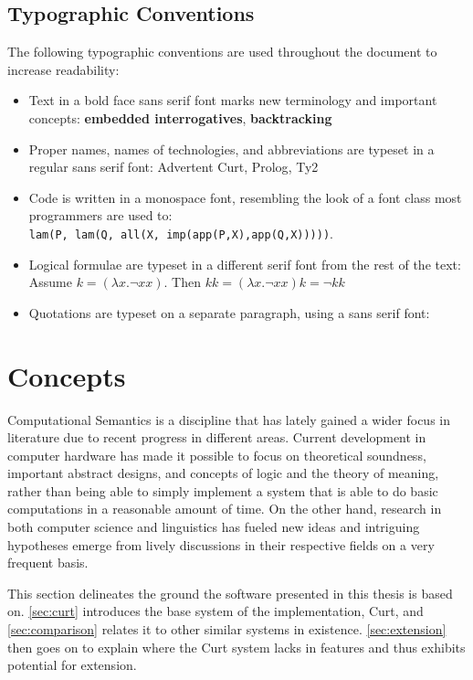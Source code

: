 \documentclass[a4paper]{article}
\newcommand{\term}[1]{\textsf{\textbf{#1}}} %
\newcommand{\code}[1]{\texttt{#1}} %
\newcommand{\pn}{\textsf} %
\newcommand{\quotesf}[1]{\quote{\textsf{#1}}}
\newcommand{\curt}{\pn{Curt}}
\newcommand{\acurt}{\pn{Advertent Curt}}
\newcommand{\prol}{\pn{Prolog}}
\theoremstyle{remark}
\theoremstyle{remark}
\theoremstyle{definition}
\theoremstyle{definition}
\begin{document}
\subsection{Typographic Conventions}

The following typographic conventions are used throughout the document to
increase readability:

\begin{itemize}
  \item Text in a bold face sans serif font marks new terminology and important
  concepts: \term{embedded interrogatives}, \term{backtracking}
  \item Proper names, names of technologies, and abbreviations are typeset in a
  regular sans serif font: \acurt, \prol, \pn{Ty2}
  \item Code is written in a monospace font, resembling the look of a font class most
  programmers are used to:\\
  \code{lam(P, lam(Q, all(X, imp(app(P,X),app(Q,X)))))}.
  \item Logical formulae are typeset in a different serif font from the rest of
  the text:\\
    Assume $k = (\lambda x.\neg xx)$. Then $ kk = (\lambda x .\neg xx)k = \neg kk$
  \item Quotations  are typeset on a separate paragraph, using a sans serif font:
  \quotesf{This answers the question!}
\end{itemize}


\section{Concepts}

Computational Semantics is a discipline that has  lately gained a wider focus in
literature due to recent progress in different areas.  Current development in
computer hardware has made it possible to focus on theoretical soundness,
important abstract designs, and concepts of logic and the theory of meaning,
rather than being able to simply implement a system that is able to do basic
computations in a reasonable amount of time. On the other hand, research in both
computer science and linguistics has fueled new ideas and intriguing hypotheses
emerge from lively discussions in their respective fields on a very frequent
basis.

This section delineates the ground the software presented in this thesis is
based on. \ref{sec:curt} introduces the base system of the implementation,
\curt{},
and \ref{sec:comparison} relates it to other similar systems in existence.
\ref{sec:extension} then goes on to explain where the \curt{} system lacks in
features and thus exhibits potential for extension.
\end{document}

